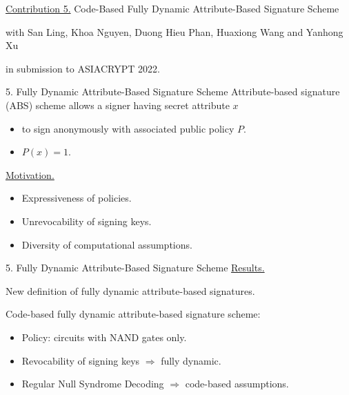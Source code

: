\begin{frame}
	\underline{Contribution 5.} Code-Based Fully Dynamic Attribute-Based Signature Scheme
	
	{\small with San Ling, Khoa Nguyen, Duong Hieu Phan, Huaxiong Wang and Yanhong Xu}
	
	in submission to ASIACRYPT 2022.
\end{frame}

\begin{frame}{5. Fully Dynamic Attribute-Based Signature Scheme}
	Attribute-based signature (ABS) scheme allows a signer having secret attribute $x$
	\begin{itemize}
		\item to sign anonymously with associated public policy $P$.
		\item $P(x) = 1$.
	\end{itemize}
	
	\underline{Motivation.}
	\begin{itemize}
		\item Expressiveness of policies.
		\item Unrevocability of signing keys.
		\item Diversity of computational assumptions.
	\end{itemize}
\end{frame}

\begin{frame}{5. Fully Dynamic Attribute-Based Signature Scheme}
	\underline{Results.} 
	
	New definition of fully dynamic attribute-based signatures.
	
	Code-based fully dynamic attribute-based signature scheme:
	\begin{itemize}
		\item Policy: circuits with NAND gates only.
		\item Revocability of signing keys $\Rightarrow$ fully dynamic.
		\item Regular Null Syndrome Decoding $\Rightarrow$ code-based assumptions.
	\end{itemize}
\end{frame}

